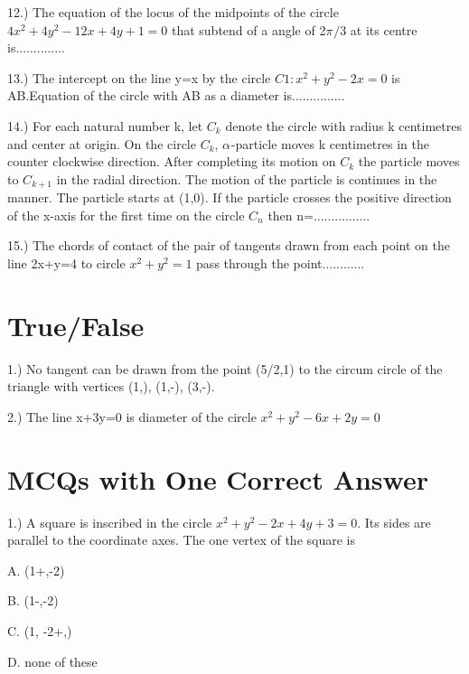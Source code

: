 \documentclass{article}
\begin{document}
\vspace{5mm}
12.) The equation of the locus of the midpoints of the circle $4x^2+4y^2-12x+4y+1=0$ that subtend of a angle of 2$\pi_{}/3$  at its centre is..............

\vspace{5mm}
13.) The intercept on the line y=x by the circle $C1:x^2+y^2-2x=0$ is AB.Equation of the circle with AB as a diameter is...............

\vspace{5mm}
14.) For each natural number k, let $C_k$ denote the circle with radius k centimetres and center at origin. On the circle $C_k$, $\alpha_{}$-particle moves k centimetres in the counter clockwise direction. After completing its motion on $C_k$ the particle moves to $C_{k+1}$ in the radial direction. The motion of the particle is continues in the manner. The particle starts at (1,0). If the particle crosses the positive direction of the x-axis for the first time on the circle $C_n$ then n=................

\vspace{5mm}

15.) The chords of contact of the pair of tangents drawn from each point on the line 2x+y=4 to circle $x^2+y^2=1$ pass through the point............


\section{True/False}

  1.) No tangent can be drawn from the point (5/2,1) to the circum circle of the triangle with vertices (1,), (1,-),  (3,-).
  
  \vspace{5mm}
2.) The line x+3y=0 is diameter of the circle $x^2+y^2-6x+2y=0$ 

\section{MCQs with One Correct Answer}

1.) A square is inscribed in the circle  $x^2+y^2-2x+4y+3=0$. Its sides are parallel to the coordinate axes. The one vertex of the square is

\choice  A. (1+,-2)

\choice  B. (1-,-2)

\choice  C. (1, -2+,)

\choice  D. none of these
\end{document}
